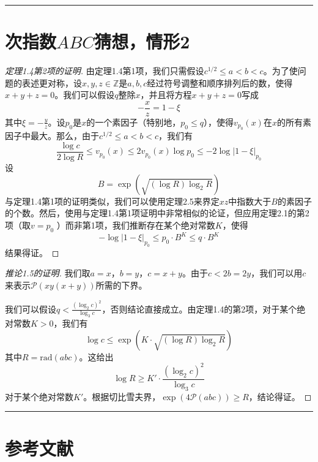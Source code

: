 \documentclass{article}
\begin{document}
\vspace{3em}

\hrule
\part{次指数\(ABC\)猜想，情形2}
\begin{proof}[定理1.4第2项的证明]
由定理1.4第1项，我们只需假设\(c^{1/2}\leq a < b < c\)。为了使问题的表述更对称，设\(x,y,z\in\mathbb{Z}\)是\(a,b,c\)经过符号调整和顺序排列后的数，使得\(x + y + z = 0\)。我们可以假设\(q\)整除\(x\)，并且将方程\(x + y + z = 0\)写成
\[-\frac{x}{z}=1-\xi\]
其中\(\xi = -\frac{y}{z}\)。设\(p_{0}\)是\(x\)的一个素因子（特别地，\(p_{0}\leq q\)），使得\(v_{p_{0}}(x)\)在\(x\)的所有素因子中最大。那么，由于\(c^{1/2}\leq a < b < c\)，我们有
\[\frac{\log c}{2\log R}\leq v_{p_{0}}(x)\leq 2v_{p_{0}}(x)\log p_{0}\leq - 2\log|1 - \xi|_{p_{0}}\]
设
\[B=\exp\left(\sqrt{(\log R)\log_{2}R}\right)\]
与定理1.4第1项的证明类似，我们可以使用定理2.5来界定\(xz\)中指数大于\(B\)的素因子的个数。然后，使用与定理1.4第1项证明中非常相似的论证，但应用定理2.1的第2项（取\(v = p_{0}\) ）而非第1项，我们推断存在某个绝对常数\(K\)，使得
\[- \log|1 - \xi|_{p_{0}}\leq p_{0}\cdot B^{K}\leq q\cdot B^{K}\]
结果得证。
\end{proof}

\begin{proof}[推论1.5的证明]
我们取\(a = x\)，\(b = y\)，\(c = x + y\)。由于\(c < 2b = 2y\)，我们可以用\(c\)来表示\(\mathscr{P}(xy(x + y))\)所需的下界。

我们可以假设\(q<\frac{(\log_{2}c)^{2}}{\log_{3}c}\)，否则结论直接成立。由定理1.4的第2项，对于某个绝对常数\(K>0\)，我们有
\[\log c\leq\exp\left(K\cdot\sqrt{(\log R)\log_{2}R}\right)\]
其中\(R=\text{rad}(abc)\)。这给出
\[\log R\geq K'\cdot\frac{(\log_{2}c)^{2}}{\log_{3}c}\]
对于某个绝对常数\(K'\)。根据切比雪夫界，\(\exp(4\mathscr{P}(abc))\geq R\)，结论得证。
\end{proof}

\newpage
\hrule
\part{参考文献}
\end{document}
